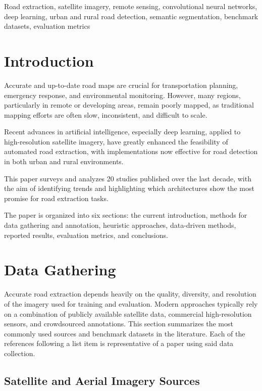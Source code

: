 \documentclass[conference]{IEEEtran}
\begin{document}
\begin{IEEEkeywords}
    Road extraction, satellite imagery, remote sensing, convolutional neural networks, deep learning, urban and rural road detection, semantic segmentation, benchmark datasets, evaluation metrics
\end{IEEEkeywords}

\section{Introduction}
Accurate and up-to-date road maps are crucial for transportation planning,
emergency response, and environmental monitoring. However, many regions,
particularly in remote or developing areas, remain poorly mapped, as
traditional mapping efforts are often slow, inconsistent, and difficult to
scale.

Recent advances in artificial intelligence, especially deep learning, applied
to high-resolution satellite imagery, have greatly enhanced the feasibility of
automated road extraction, with implementations now effective for road
detection in both urban and rural environments.

This paper surveys and analyzes 20 studies published over the last decade, with
the aim of identifying trends and highlighting which architectures show the
most promise for road extraction tasks.

The paper is organized into six sections: the current introduction, methods for
data gathering and annotation, heuristic approaches, data-driven methods,
reported results, evaluation metrics, and conclusions.
\section{Data Gathering}

Accurate road extraction depends heavily on the quality, diversity, and
resolution of the imagery used for training and evaluation. Modern approaches
typically rely on a combination of publicly available satellite data,
commercial high-resolution sensors, and crowdsourced annotations. This section
summarizes the most commonly used sources and benchmark datasets in the
literature. Each of the references following a list item is representative of a
paper using said data collection.

\subsection{Satellite and Aerial Imagery Sources}
\end{document}
